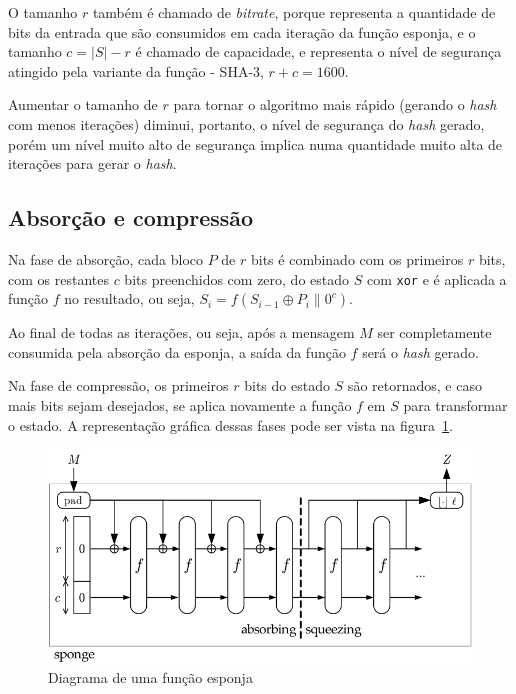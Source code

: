 O tamanho $r$ também é chamado de \textit{bitrate}, porque representa a
quantidade de bits da entrada que são consumidos em cada iteração da função
esponja, e o tamanho $c = |S| - r$ é chamado de capacidade, e representa o
nível de segurança atingido pela variante da função - SHA-3, $r + c = 1600$.

Aumentar o tamanho de $r$ para tornar o algoritmo mais rápido (gerando o
\textit{hash} com menos iterações) diminui, portanto, o nível de segurança do
\textit{hash} gerado, porém um nível muito alto de segurança implica numa
quantidade muito alta de iterações para gerar o \textit{hash}.

\subsection{Absorção e compressão}

Na fase de absorção, cada bloco $P$ de $r$ bits é combinado com os primeiros
$r$ bits, com os restantes $c$ bits preenchidos com zero, do estado $S$ com
\texttt{xor} e é aplicada a função $f$ no resultado, ou seja,
$S_{i} = f(S_{i-1} \oplus P_{i} \| 0^{c})$.

Ao final de todas as iterações, ou seja, após a mensagem $M$ ser completamente
consumida pela absorção da esponja, a saída da função $f$ será o \textit{hash}
gerado.

Na fase de compressão, os primeiros $r$ bits do estado $S$ são retornados, e
caso mais bits sejam desejados, se aplica novamente a função $f$ em $S$ para
transformar o estado. A representação gráfica dessas fases pode ser vista na
figura~\ref{fig:sponge}.

\begin{figure}[ht]
    \centering
    \includegraphics{images/esponja.png}
    \caption{Diagrama de uma função esponja}
    \label{fig:sponge}
\end{figure}

